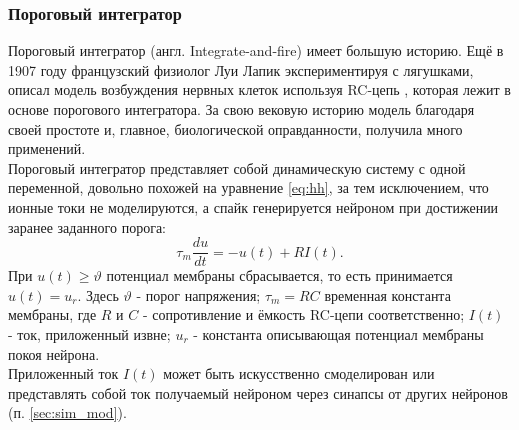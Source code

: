 \documentclass[a4paper,10pt]{article}
\begin{document}
\subsubsection{Пороговый интегратор}
\indent Пороговый интегратор (англ. Integrate-and-fire) имеет большую историю. Ещё в 1907 году 	французский физиолог Луи Лапик экспериментируя с лягушками, описал модель возбуждения нервных клеток используя RC-цепь \cite{Lapicque}, которая лежит в основе порогового интегратора. За свою вековую историю модель благодаря своей простоте и, главное, биологической оправданности, получила много применений.\\
   \indent Пороговый интегратор представляет собой динамическую систему с одной переменной, довольно похожей на уравнение \eqref{eq:hh}, за тем исключением, что ионные токи не моделируются, а спайк генерируется нейроном при достижении заранее заданного порога:\\
   \begin{equation*}\label{eq:iaf}
   \tau_{m}\frac{du}{dt} =-u(t)+R I(t).
   \end{equation*}
\indent При $u(t) \geq \vartheta$ потенциал мембраны сбрасывается, то есть принимается $u(t)=u_{r}$.
Здесь $\vartheta$ - порог напряжения; $\tau_{m}=RC$ временная константа мембраны, где $R$ и $C$ - сопротивление и ёмкость RC-цепи соответственно; $I(t)$ - ток, приложенный извне; $u_{r}$ - константа описывающая потенциал мембраны покоя нейрона.\\
\indent Приложенный ток $I(t)$ может быть искусственно смоделирован или представлять собой ток получаемый нейроном через синапсы от других нейронов (п. \ref{sec:sim_mod}).
\end{document}
